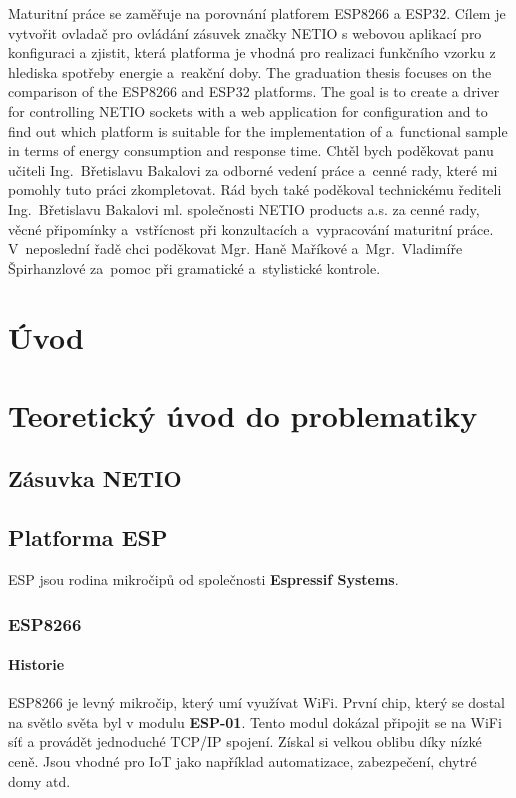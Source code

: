 \documentclass[a4paper, 12pt]{report}
\begin{document}
	\titulniStrana
	\anotace
		Maturitní práce se zaměřuje na porovnání platforem ESP8266 a ESP32. Cílem je vytvořit ovladač pro ovládání zásuvek značky NETIO s webovou aplikací pro konfiguraci a zjistit, která platforma je vhodná pro realizaci funkčního vzorku z hlediska spotřeby energie a~reakční doby.
	\annotation
		The graduation thesis focuses on the comparison of the ESP8266 and ESP32 platforms. The goal is to create a driver for controlling NETIO sockets with a web application for configuration and to find out which platform is suitable for the implementation of a~functional sample in terms of energy consumption and response time.
	\podekovani
		Chtěl bych poděkovat panu učiteli Ing.~Břetislavu Bakalovi za odborné vedení práce a~cenné rady, které mi pomohly tuto práci zkompletovat. Rád bych také poděkoval  technickému řediteli Ing.~Břetislavu Bakalovi ml. společnosti NETIO products a.s. za cenné rady, věcné připomínky a~vstřícnost při konzultacích a~vypracování maturitní práce. V~neposlední řadě chci poděkovat Mgr. Haně Maříkové a~Mgr.~Vladimíře Špirhanzlové za~pomoc při gramatické a~stylistické kontrole.
	\tableofcontents

	\chapter{Úvod}
	\chapter{Teoretický úvod do problematiky}

		\section{Zásuvka NETIO}

		\section{Platforma ESP}
			ESP jsou rodina mikročipů od společnosti \textbf{Espressif Systems}.
			\subsection{ESP8266}

				\subsubsection{Historie}
					ESP8266 je levný mikročip, který umí využívat WiFi. První chip, který se dostal na světlo světa byl v modulu \textbf{ESP-01}. Tento modul dokázal připojit se na WiFi síť a provádět jednoduché TCP/IP spojení. Získal si velkou oblibu díky nízké ceně. Jsou vhodné pro IoT jako například automatizace, zabezpečení, chytré domy atd.
\end{document}
